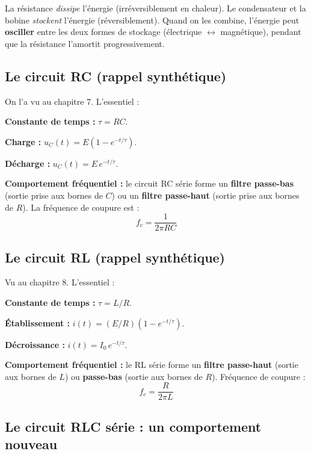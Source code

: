 \documentclass[12pt,a4paper,twoside]{book}
\begin{document}
\begin{intuition}
La résistance \textit{dissipe} l'énergie (irréversiblement en chaleur). Le condensateur et la bobine \textit{stockent} l'énergie (réversiblement). Quand on les combine, l'énergie peut \textbf{osciller} entre les deux formes de stockage (électrique $\leftrightarrow$ magnétique), pendant que la résistance l'amortit progressivement.
\end{intuition}

\subsection{Le circuit RC (rappel synthétique)}

On l'a vu au chapitre 7. L'essentiel :

\begin{formule}
\textbf{Constante de temps :} $\tau = RC$.

\textbf{Charge :} $u_C(t) = E(1 - e^{-t/\tau})$.

\textbf{Décharge :} $u_C(t) = E\,e^{-t/\tau}$.

\textbf{Comportement fréquentiel :} le circuit RC série forme un \textbf{filtre passe-bas} (sortie prise aux bornes de $C$) ou un \textbf{filtre passe-haut} (sortie prise aux bornes de $R$). La fréquence de coupure est :
\[
\boxed{f_c = \frac{1}{2\pi RC}}
\]
\end{formule}

\subsection{Le circuit RL (rappel synthétique)}

Vu au chapitre 8. L'essentiel :

\begin{formule}
\textbf{Constante de temps :} $\tau = L/R$.

\textbf{Établissement :} $i(t) = (E/R)(1 - e^{-t/\tau})$.

\textbf{Décroissance :} $i(t) = I_0\,e^{-t/\tau}$.

\textbf{Comportement fréquentiel :} le RL série forme un \textbf{filtre passe-haut} (sortie aux bornes de $L$) ou \textbf{passe-bas} (sortie aux bornes de $R$). Fréquence de coupure :
\[
\boxed{f_c = \frac{R}{2\pi L}}
\]
\end{formule}

\subsection{Le circuit RLC série : un comportement nouveau}
\end{document}

